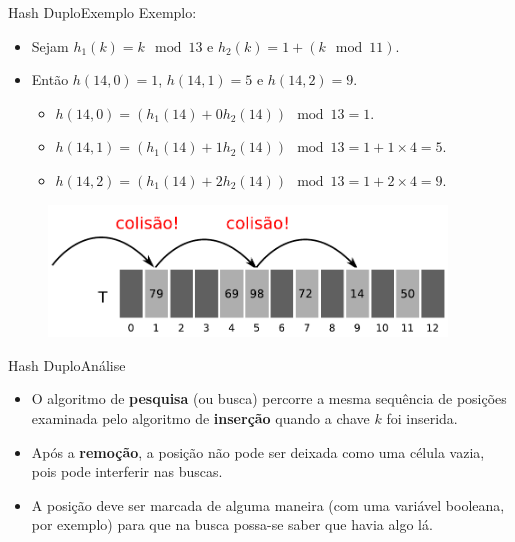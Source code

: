 \documentclass[aspectratio=169]{beamer}
\begin{document}
\begin{frame}{Hash Duplo}{Exemplo}
Exemplo:
\begin{itemize}
 \item Sejam $h_1 (k) = k \mod 13$ e $h_2 (k) = 1 + (k \mod 11)$.
 \item Então $h(14, 0) = 1$, $h(14, 1) = 5$ e $h(14, 2) = 9$.
 \begin{itemize}
 \item $h(14, 0) = (h_1 (14) + 0 h_2 (14)) \mod 13 = 1.$
 \item $h(14, 1) = (h_1 (14) + 1 h_2 (14)) \mod 13 = 1 + 1 \times 4  = 5.$
 \item $h(14, 2) = (h_1 (14) + 2 h_2 (14)) \mod 13 = 1 + 2 \times 4 = 9.$
 \end{itemize}
\end{itemize}
\begin{figure}[!h]
  \centering
  \includegraphics[width=300pt]{imagens/ex_hash_duplo.png}
  \label{fig_ex_hash_duplo}
\end{figure}
\end{frame}

\begin{frame}{Hash Duplo}{Análise}
\begin{itemize}
\item O algoritmo de {\bf pesquisa} (ou busca) percorre a mesma sequência de posições examinada pelo algoritmo de {\bf inserção} quando a chave $k$ foi inserida.
\item Após a {\bf remoção}, a posição não pode ser deixada como uma célula vazia, pois pode interferir nas buscas.
\item A posição deve ser marcada de alguma maneira (com uma variável booleana, por exemplo) para que na busca possa-se saber que havia algo lá.
\end{itemize}
\end{frame}
\end{document}

